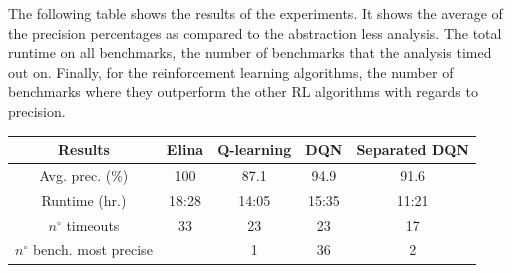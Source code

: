 The following table shows the results of the experiments. It shows the average of the precision percentages as compared to the abstraction less analysis. The total runtime on all benchmarks, the number of benchmarks that the analysis timed out on. Finally, for the reinforcement learning algorithms, the number of benchmarks where they outperform the other RL algorithms with regards to precision.

\begin{center}
\begin{tabular}{||c c c c c||}
 
 \hline
 Results & Elina & Q-learning & DQN & Separated DQN \\ [0.5ex] 
 \hline\hline
 Avg. prec. (\%) & 100 & 87.1 & 94.9 & 91.6\\
 Runtime (hr.) & 18:28 & 14:05 & 15:35 & 11:21\\
 $n^{\circ}$ timeouts & 33 & 23 & 23 & 17\\
 $n^{\circ}$ bench. most precise &  & 1 & 36 & 2\\
 
 \hline
\end{tabular}
\end{center}

